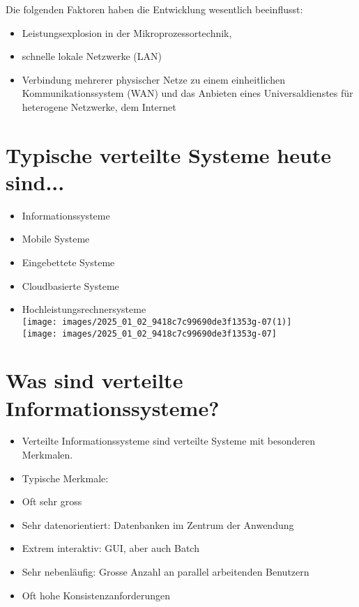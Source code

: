 \documentclass[10pt]{article}
\begin{document}
Die folgenden Faktoren haben die Entwicklung wesentlich beeinflusst:

\begin{itemize}
  \item Leistungsexplosion in der Mikroprozessortechnik,
  \item schnelle lokale Netzwerke (LAN)
  \item Verbindung mehrerer physischer Netze zu einem einheitlichen Kommunikationssystem (WAN) und das Anbieten eines Universaldienstes für heterogene Netzwerke, dem Internet
\end{itemize}

\section*{Typische verteilte Systeme heute sind...}
\begin{itemize}
  \item Informationssysteme
  \item Mobile Systeme
  \item Eingebettete Systeme
  \item Cloudbasierte Systeme
  \item Hochleistungsrechnersysteme\\
\texttt{[image: images/2025\_01\_02\_9418c7c99690de3f1353g-07(1)]}\\
\texttt{[image: images/2025\_01\_02\_9418c7c99690de3f1353g-07]}
\end{itemize}

\section*{Was sind verteilte Informationssysteme?}
\begin{itemize}
  \item Verteilte Informationssysteme sind verteilte Systeme mit besonderen Merkmalen.
  \item Typische Merkmale:
  \item Oft sehr gross
  \item Sehr datenorientiert: Datenbanken im Zentrum der Anwendung
  \item Extrem interaktiv: GUI, aber auch Batch
  \item Sehr nebenläufig: Grosse Anzahl an parallel arbeitenden Benutzern
  \item Oft hohe Konsistenzanforderungen
\end{itemize}
\end{document}
